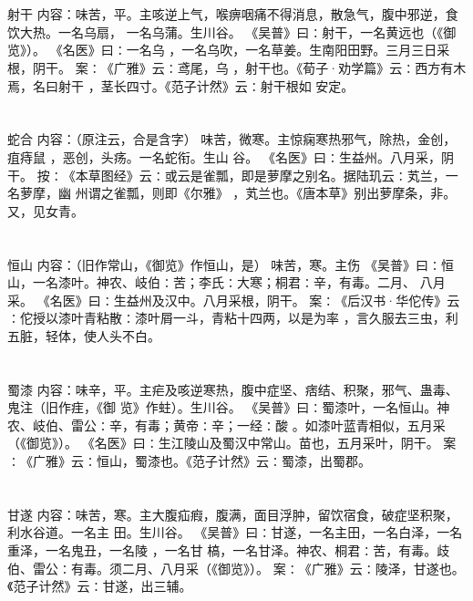 \documentclass[12pt,UTF8]{ctexbook}
\begin{document}
\section{}射干
内容：味苦，平。主咳逆上气，喉痹咽痛不得消息，散急气，腹中邪逆，食饮大热。一名乌扇， 
一名乌蒲。生川谷。 
《吴普》曰∶射干，一名黄远也（《御览》）。 
《名医》曰∶一名乌 ，一名乌吹，一名草姜。生南阳田野。三月三日采根，阴干。 
案∶《广雅》云∶鸢尾，乌 ，射干也。《荀子·劝学篇》云∶西方有木焉，名曰射干 
，茎长四寸。《范子计然》云∶射干根如 安定。 


\section{}蛇合
内容：（原注云，合是含字） 
味苦，微寒。主惊痫寒热邪气，除热，金创，疽痔鼠 ，恶创，头疡。一名蛇衔。生山 
谷。 
《名医》曰∶生益州。八月采，阴干。 
按∶《本草图经》云∶或云是雀瓢，即是萝摩之别名。据陆玑云∶芄兰，一名萝摩，幽 
州谓之雀瓢，则即《尔雅》 ，芄兰也。《唐本草》别出萝摩条，非。又，见女青。 


\section{}恒山
内容：（旧作常山，《御览》作恒山，是） 
味苦，寒。主伤 
《吴普》曰∶恒山，一名漆叶。神农、岐伯∶苦；李氏∶大寒；桐君∶辛，有毒。二月、 
八月采。 
《名医》曰∶生益州及汉中。八月采根，阴干。 
案∶《后汉书·华佗传》云∶佗授以漆叶青粘散∶漆叶屑一斗，青粘十四两，以是为率 
，言久服去三虫，利五脏，轻体，使人头不白。 


\section{}蜀漆
内容：味辛，平。主疟及咳逆寒热，腹中症坚、痞结、积聚，邪气、蛊毒、鬼注（旧作疰，《御 
览》作蛀）。生川谷。 
《吴普》曰∶蜀漆叶，一名恒山。神农、岐伯、雷公∶辛，有毒；黄帝∶辛；一经∶酸 
。如漆叶蓝青相似，五月采（《御览》）。 
《名医》曰∶生江陵山及蜀汉中常山。苗也，五月采叶，阴干。 
案∶《广雅》云∶恒山，蜀漆也。《范子计然》云∶蜀漆，出蜀郡。 


\section{}甘遂
内容：味苦，寒。主大腹疝瘕，腹满，面目浮肿，留饮宿食，破症坚积聚，利水谷道。一名主 
田。生川谷。 
《吴普》曰∶甘遂，一名主田，一名白泽，一名重泽，一名鬼丑，一名陵 ，一名甘 
槁，一名甘泽。神农、桐君∶苦，有毒。歧伯、雷公∶有毒。须二月、八月采（《御览》）。 
案∶《广雅》云∶陵泽，甘遂也。《范子计然》云∶甘遂，出三辅。 
\end{document}
